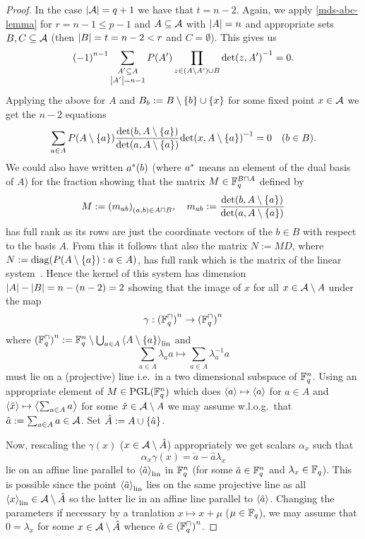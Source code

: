 \begin{proof}
    In the case $\left|\mathcal{A}\right|=q+1$ we have that $t=n-2$.
    Again, we apply \autoref{mds-abc-lemma} for $r=n-1\leq p-1$ and $A\subseteq \mathcal{A}$ with
    $\left|A\right|=n$ and appropriate sets $B,C\subseteq \mathcal{A}$ (then
    $\left|B\right|=t=n-2<r$ and $C=\emptyset$). This gives us
    $$ {(-1)}^{n-1}\sum_{\substack{A'\subseteq A \\
            \left|A'\right|=n-1}}{P(A')\prod_{z\in (A\setminus A')\cup
            B}{{\det(z,A')}^{-1}}} = 0.
    $$
    Applying the above for $A$ and $B_b:=B\setminus\left\{b\right\}\cup\left\{x\right\}$ for some fixed point $x\in \mathcal{A}$ we get the $n-2$ equations
    $$
    \sum_{a\in A}{P(A\setminus\left\{a\right\})\frac{\det(b,A\setminus\left\{a\right\})}{\det(a,A\setminus\left\{a\right\})}{\det(x,A\setminus\left\{a\right\})}^{-1}} = 0\quad (b\in B).\label{mds-class-n-leq-p-keysys}
    $$
    We could also have written $a^{\ast}(b)$ (where $a^{\ast}$ means an element of the dual basis of $A$) for the fraction showing that the matrix $M\in \field{q}^{B\settimes A}$ defined by
    $$
    M:={(m_{ab})}_{(a,b)\in A\settimes B},\quad
    m_{ab} := \frac{\det(b,A\setminus\set{a})}{\det(a,A\setminus\set{a})}
    $$
    has full rank as its rows are just the coordinate vectors of the $b\in B$ with respect to the basis $A$.%
    From this it follows that also the matrix $N:=MD$, where $N:=\mathop\mathrm{diag}(P(A\setminus\left\{a\right\}):a\in A)$, has full rank which is the matrix of the linear system~.
    Hence the kernel of this system has dimension $\left|A\right|-\left|B\right|=n-(n-2)=2$ showing that the image of $x$ for all $x\in \mathcal{A}\setminus A$ under the map
    $$
    \gamma:{(\units{\field{q}})}^n\to{(\units{\field{q}})}^n
    $$
    where ${(\units{\field{q}})}^n:=\field{q}^n\setminus\bigsetjoin_{a\in A}{\gen{A\setminus\set{a}}_{\lin}}$ and
    $$
    \sum_{a\in A}{\lambda_a a}\mapsto \sum_{a\in A}{\lambda_a^{-1} a}
    $$
    must lie on a (projective) line i.e.~in a two dimensional subspace of $\mathbb{F}_{q}^n$.
    Using an appropriate element of $M\in\mathrm{PGL}(\mathbb{F}_{q}^n)$ which does $\gen a \mapsto \gen a$ for $a\in A$ and $\gen{\hat x}\mapsto \gen{\sum_{a\in A}{a}}$ for some $\hat x\in \mathcal{A}\setminus A$ we may assume w.l.o.g.~that $\hat a:=\sum_{a\in A}{a}\in \mathcal{A}$. Set $\hat{A}:=A\cup\left\{\hat a\right\}$. 

    Now, rescaling the $\gamma(x)$ ($x\in\mathcal{A}\setminus \hat A$) appropriately we get scalars $\alpha_x$ such that
    $$
    \alpha_x\gamma(x)=\check a-\hat a\lambda_x
    $$
    lie on an affine line parallel to $\gen{\hat a}_{\lin}$ in $\mathbb{F}_{q}^n$ (for some $\check a\in\mathbb{F}_{q}^n$ and $\lambda_x\in\mathbb{F}_{q}$). This is possible since the point $\gen{\hat a}_{\lin}$ lies on the same projective line as all $\gen{x}_{\lin}\in\cA\setminus \hat A$ so the latter lie in an affine line parallel to $\gen{\hat a}$.
    Changing the parameters if necessary by a tranlation $x\mapsto x+\mu$ ($\mu\in\mathbb{F}_{q}$), we may assume that $0=\lambda_x$ for some $x\in \mathcal{A}\setminus \hat{A}$ whence $\check a\in {(\units{\field{q}})}^n$.


\end{proof}
